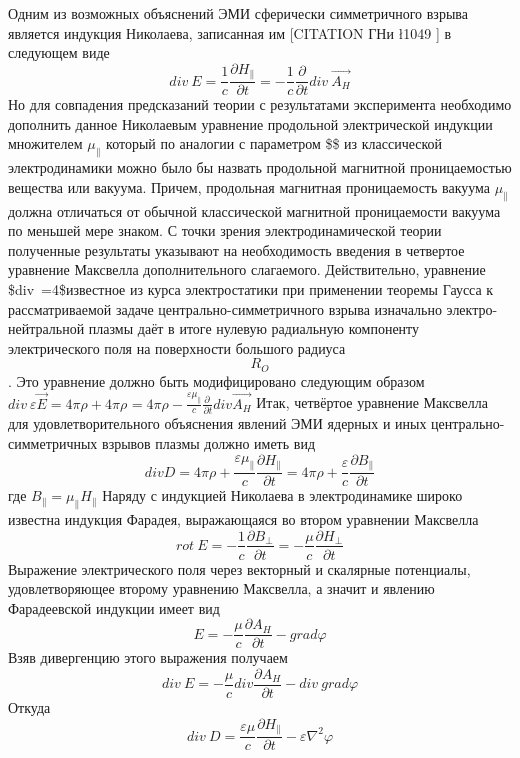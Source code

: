\documentclass[11pt]{article}
\begin{document}
Одним из возможных объяснений ЭМИ сферически симметричного взрыва
является индукция Николаева, записанная им {[}CITATION ГНи \l 1049 {]} в
следующем виде
\[div\ E=\frac{1}{c}\frac{\partial {{H}_{\parallel }}}{\partial t}=-\frac{1}{c}\frac{\partial }{\partial t}div\ \overrightarrow{{{A}_{H}}}\]
Но для совпадения предсказаний теории с результатами эксперимента
необходимо дополнить данное Николаевым уравнение продольной
электрической индукции множителем \({{\mu }_{\parallel }}\) который по
аналогии с параметром \$\mu \$ из классической электродинамики можно
было бы назвать продольной магнитной проницаемостью вещества или
вакуума. Причем, продольная магнитная проницаемость вакуума
\({{\mu }_{\parallel }}\) должна отличаться от обычной классической
магнитной проницаемости вакуума по меньшей мере знаком. С точки зрения
электродинамической теории полученные результаты указывают на
необходимость введения в четвертое уравнение Максвелла дополнительного
слагаемого. Действительно, уравнение
\$div~\varepsilon {}=4\pi \rho \$известное из курса
электростатики при применении теоремы Гаусса к рассматриваемой задаче
центрально-симметричного взрыва изначально электро-нейтральной плазмы
даёт в итоге нулевую радиальную компоненту электрического поля на
поверхности большого радиуса \[{{R}_{O}}\]. Это уравнение должно быть
модифицировано следующим образом
\(div\ \varepsilon \overrightarrow{E}=4\pi \rho +4\pi {{\rho }_{}}=4\pi \rho -\frac{\varepsilon {{\mu }_{\parallel }}}{c}\frac{\partial \ }{\partial t}div\overrightarrow{{{A}_{H}}}\)
Итак, четвёртое уравнение Максвелла для удовлетворительного объяснения
явлений ЭМИ ядерных и иных центрально-симметричных взрывов плазмы должно
иметь вид
\[divD=4\pi \rho +\frac{\varepsilon {{\mu }_{\parallel }}}{c}\frac{\partial {{H}_{\parallel }}}{\partial t}=4\pi \rho +\frac{\varepsilon }{c}\frac{\partial {{B}_{\parallel }}}{\partial t}\]
где \({{B}_{\parallel }}={{\mu }_{\parallel }}{{H}_{\parallel }}\)
Наряду с индукцией Николаева в электродинамике широко известна индукция
Фарадея, выражающаяся во втором уравнении Максвелла
\[rot\ E=-\frac{1}{c}\frac{\partial {{B}_{\bot }}}{\partial t}=-\frac{\mu }{c}\frac{\partial {{H}_{\bot }}}{\partial t}\]
Выражение электрического поля через векторный и скалярные потенциалы,
удовлетворяющее второму уравнению Максвелла, а значит и явлению
Фарадеевской индукции имеет вид
\[E=-\frac{\mu }{c}\frac{\partial {{A}_{H}}}{\partial t}-grad\varphi \]
Взяв дивергенцию этого выражения получаем
\[div\ E=-\frac{\mu }{c}div\frac{\partial {{A}_{H}}}{\partial t}-div\ grad\varphi \]
Откуда
\[div\ D=\frac{\varepsilon \mu }{c}\frac{\partial {{H}_{\parallel }}}{\partial t}-\varepsilon {{\nabla }^{2}}\varphi \]
\end{document}
